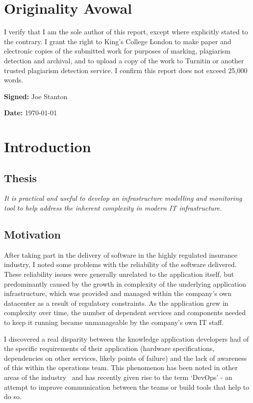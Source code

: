 \documentclass{cshonours}
\begin{document}
\chapter*{Originality Avowal}
I verify that I am the sole author of this report, except where explicitly stated to the contrary. I grant the right to King’s College London to make paper and electronic copies of the submitted work for purposes of marking, plagiarism detection and archival, and to upload a copy of the work to Turnitin or another trusted plagiarism detection service. I confirm this report does not exceed 25,000 words.

\textbf{Signed:} Joe Stanton 

\textbf{Date:} \today


\tableofcontents

\chapter{Introduction}

\section{Thesis}
\textit{It is practical and useful to develop an infrastructure modelling and monitoring tool to help address the inherent complexity in modern IT infrastructure.}
\section{Motivation}

After taking part in the delivery of software in the highly regulated insurance industry, I noted some problems with the reliability of the software delivered. These reliability issues were generally unrelated to the application itself, but predominantly caused by the growth in complexity of the underlying application infrastructure, which was provided and managed within the company's own datacenter as a result of regulatory constraints. As the application grew in complexity over time, the number of dependent services and components needed to keep it running became unmanageable by the company's own IT staff.

I discovered a real disparity between the knowledge application developers had of the specific requirements of their application (hardware specifications, dependencies on other services, likely points of failure) and the lack of awareness of this within the operations team. This phenomenon has been noted in other areas of the industry~\cite{DevOps} and has recently given rise to the term `DevOps' - an attempt to improve communication between the teams or build tools that help to do so.
\end{document}
